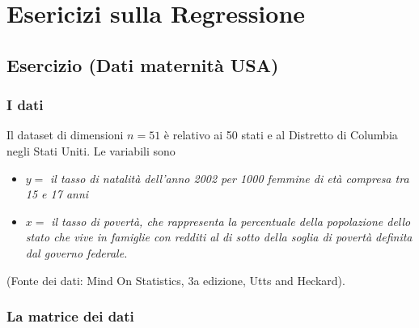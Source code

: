 \documentclass[
  11pt,
]{book}
\providecommand{\tightlist}{%
  \setlength{\itemsep}{0pt}\setlength{\parskip}{0pt}}
\theoremstyle{mytheoremstyle}
\theoremstyle{mydefstyle}
\begin{document}
\chapter{Esericizi sulla Regressione}\label{esericizi-sulla-regressione}

\section{Esercizio (Dati maternità USA)}\label{esercizio-dati-maternituxe0-usa}

\subsection{I dati}\label{i-dati}

Il dataset di dimensioni \(n = 51\) è relativo ai 50 stati e al Distretto di Columbia negli Stati Uniti. Le variabili sono

\begin{itemize}
\tightlist
\item
  \(y =\) \emph{il tasso di natalità dell'anno 2002 per 1000 femmine di età compresa tra 15 e 17 anni}\\
\item
  \(x =\) \emph{il tasso di povertà, che rappresenta la percentuale della popolazione dello stato che vive in famiglie con redditi al di sotto della soglia di povertà definita dal governo federale.}
\end{itemize}

(Fonte dei dati: Mind On Statistics, 3a edizione, Utts and Heckard).

\subsection{La matrice dei dati}\label{la-matrice-dei-dati}
\end{document}
